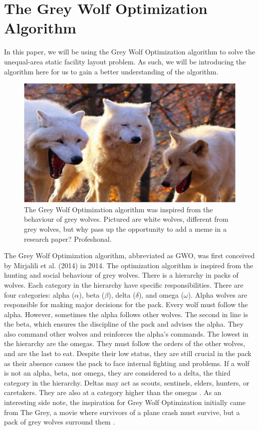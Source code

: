 \section{The Grey Wolf Optimization Algorithm}
In this paper, we will be using the Grey Wolf Optimization algorithm to solve the unequal-area static facility layout problem. As such, we will be introducing the algorithm here for us to gain a better understanding of the algorithm.

\begin{figure}[h!]
	\centering
	\includegraphics{./images/chap01-introduction/wolves.jpg}
	\caption{The Grey Wolf Optimization algorithm was inspired from the behaviour of grey wolves. Pictured are white wolves, different from grey wolves, but why pass up the opportunity to add a meme in a research paper? Profeshonal.}
	\label{wolves-meme}
\end{figure}

The Grey Wolf Optimization algorithm, abbreviated as GWO, was first conceived by Mirjalili  et al. (2014) in 2014. The optimization algorithm is inspired from the hunting and social behaviour of grey wolves. There is a hierarchy in packs of wolves. Each category in the hierarchy have specific responsibilities. There are four categories: alpha ($\alpha$), beta ($\beta$), delta ($\delta$), and omega ($\omega$). Alpha wolves are responsible for making major decisions for the pack. Every wolf must follow the alpha. However, sometimes the alpha follows other wolves. The second in line is the beta, which ensures the discipline of the pack and advises the alpha. They also command other wolves and reinforces the alpha's commands. The lowest in the hierarchy are the omegas. They must follow the orders of the other wolves, and are the last to eat. Despite their low status, they are still crucial in the pack as their absence causes the pack to face internal fighting and problems. If a wolf is not an alpha, beta, nor omega, they are considered to a delta, the third category in the hierarchy. Deltas may act as scouts, sentinels, elders, hunters, or caretakers. They are also at a category higher than the omegas \cite{Mirjalili2014} \cite{Gupta2018}. As an interesting side note, the inspiration for Grey Wolf Optimization initially came from The Grey, a movie where survivors of a plane crash must survive, but a pack of grey wolves surround them \cite{TheGreyPlotSummary2011}.

